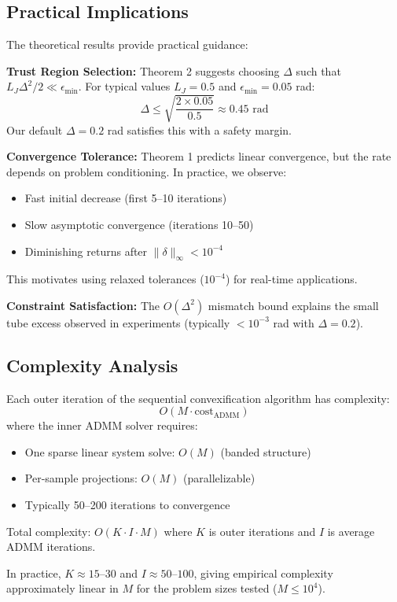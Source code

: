 \subsection{Practical Implications}

The theoretical results provide practical guidance:

\textbf{Trust Region Selection:}
Theorem 2 suggests choosing $\Delta$ such that $L_J \Delta^2 / 2 \ll \epsilon_{\min}$. For typical values $L_J = 0.5$ and $\epsilon_{\min} = 0.05$ rad:
\begin{equation}
\Delta \leq \sqrt{\frac{2 \times 0.05}{0.5}} \approx 0.45 \text{ rad}
\end{equation}
Our default $\Delta = 0.2$ rad satisfies this with a safety margin.

\textbf{Convergence Tolerance:}
Theorem 1 predicts linear convergence, but the rate depends on problem conditioning. In practice, we observe:
\begin{itemize}
\item Fast initial decrease (first 5--10 iterations)
\item Slow asymptotic convergence (iterations 10--50)
\item Diminishing returns after $\|\delta\|_\infty < 10^{-4}$
\end{itemize}

This motivates using relaxed tolerances ($10^{-4}$) for real-time applications.

\textbf{Constraint Satisfaction:}
The $O(\Delta^2)$ mismatch bound explains the small tube excess observed in experiments (typically $< 10^{-3}$ rad with $\Delta = 0.2$).

\subsection{Complexity Analysis}

\begin{proposition}
Each outer iteration of the sequential convexification algorithm has complexity:
\begin{equation}
O(M \cdot \text{cost}_{\text{ADMM}})
\end{equation}
where the inner ADMM solver requires:
\begin{itemize}
\item One sparse linear system solve: $O(M)$ (banded structure)
\item Per-sample projections: $O(M)$ (parallelizable)
\item Typically 50--200 iterations to convergence
\end{itemize}

Total complexity: $O(K \cdot I \cdot M)$ where $K$ is outer iterations and $I$ is average ADMM iterations.
\end{proposition}

In practice, $K \approx 15$--$30$ and $I \approx 50$--$100$, giving empirical complexity approximately linear in $M$ for the problem sizes tested ($M \leq 10^4$).
